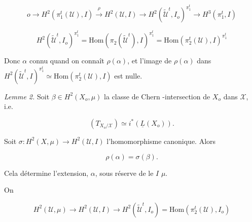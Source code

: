 \documentclass[11pt,a4paper]{article}
\begin{document}
\[ o \to H^{2}(\pi_{1}^{t}(\mathcal{U}), I) \xrightarrow{\;\rho\;} H^{2}(\mathcal{U}, I)
\to H^{2}(\tilde{\mathcal{U}}^{t}, I_{o})^{\pi_{1}^{t}} \to H^{3}(\pi_{1}^{t}, I) \]

\[ H^{2}(\tilde{\mathcal{U}}^{t}, I_{o})^{\pi_{1}^{t}} =
\mathrm{Hom}(\pi_{2}(\tilde{\mathcal{U}}^{t}), I)^{\pi_{1}^{t}} =
\mathrm{Hom}(\pi_{2}^{t}(\mathcal{U}), I)^{\pi_{1}^{t}} \]


Donc $\alpha$ connu quand on connaît $\rho(\alpha)$, et l'image de $\rho(\alpha)$
dans $H^{2}(\tilde{\mathcal{U}}^{t}, I)^{\pi_{1}^{t}} \simeq
\mathrm{Hom}(\pi_{2}^{t}(\mathcal{U}), I)$ \struck{\ill{}} est nulle.





\emph{Lemme 2.} Soit $\beta \in H^{2}(X_{o}, \mu)$ la classe de Chern
\struck{\ill{}} -intersection de $X_{o}$ dans $\mathcal{X}$,
i.e.\ \struck{\ill{}}

\[ (T_{X_{o}/\mathcal{X}}) \simeq i^{*}(\underline{L}(X_{o})). \]

Soit $\sigma : H^{2}(X, \mu) \to H^{2}(\mathcal{U}, I)$ l'homomorphisme
canonique. Alors

\[ \rho(\alpha) = \sigma(\beta). \]

Cela détermine \struck{\ill{}} l'extension, $\alpha$, sous
réserve de  le  $I$  $\mu$.

On  \ill{} \ill{}

\[ H^{2}(\mathcal{U}, \mu) \to H^{2}(\mathcal{U}, I) \to
H^{2}(\tilde{\mathcal{U}}^{t}, I_{o}) = \mathrm{Hom}(\pi_{2}^{t}(\mathcal{U}),
I_{o}) \]

\end{document}
